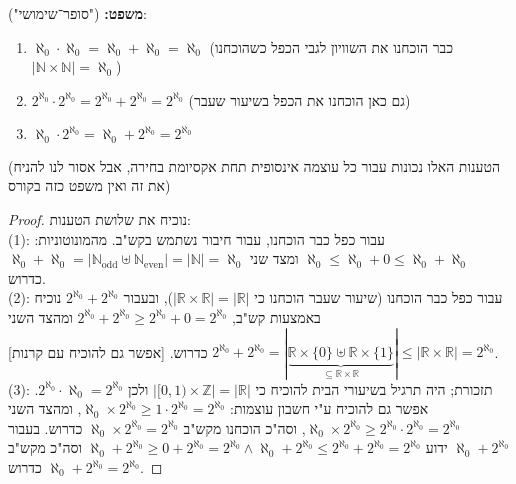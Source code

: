 \documentclass[]{article}
\newcommand\N     {\mathbb{N}}
\newcommand\Z     {\mathbb{Z}}
\newcommand\R     {\mathbb{R}}
\newcommand\Neven {\N_{\mathrm{even}}}
\newcommand\Nodd  {\N_{\mathrm{odd }}}
\newcommand\az    {\aleph_0}
\newcommand\taz   {2^{\aleph_0}}
\begin{document}
	\textbf{משפט: }("סופר־שימושי"): 
	\begin{enumerate}
		\item $ \az \cdot \az = \az + \az  = \az $ (כבר הוכחנו את השוויון לגבי הכפל כשהוכחנו $ |\N\times\N| = \az $)
		\item $ \taz \cdot \taz = \taz + \taz = \taz $ (גם כאן הוכחנו את הכפל בשיעור שעבר)
		\item $ \az \cdot \taz = \az + \taz = \taz $
	\end{enumerate}
	(הטענות האלו נכונות עבור כל עוצמה אינסופית תחת אקסיומת בחירה, אבל אסור לנו להניח את זה ואין משפט כזה בקורס)
	\begin{proof} נוכיח את שלושת הטענות: \\
	(1): עבור כפל כבר הוכחנו, עבור חיבור נשתמש בקש"ב. מהמונוטוניות: $ \az \le \az + 0 \le \az + \az $ ומצד שני $ \az + \az = |\Nodd \uplus \Neven| = |\N| = \az $ כדרוש. \\
	(2): עבור כפל כבר הוכחנו (שיעור שעבר הוכחנו כי $ |\R\times\R| = |\R| $), ובעבור $ \taz + \taz $ נוכיח באמצעות קש"ב, $ \taz + \taz \ge \taz + 0 = \taz $ ומהצד השני $ \taz + \taz = |\underbrace{\R \times \{0\} \uplus \R\times \{1\}}_{\subseteq \R\times\R}| \le |\R\times\R| = \taz$ כדרוש. [אפשר גם להוכיח עם קרנות]. \\
	(3): תזכורת; היה תרגיל בשיעורי הבית להוכיח כי $ |[0, 1) \times \Z| = |\R| $ ולכן $ \taz \cdot \az = \taz $. אפשר גם להוכיח ע"י חשבון עוצמות: $ \az \times \taz \ge 1 \cdot \taz = \taz $, ומהצד השני $ \az \times \taz \ge \taz  \cdot \taz = \taz $, וסה"כ הוכחנו מקש"ב $ \az \times \taz = \taz $ כדרוש. בעבור $ \az + \taz $ ידוע $ \az + \taz \ge 0+ \taz = \taz \land \az + \taz \le \taz + \taz = \taz $ וסה"כ מקש"ב $ \az + \taz = \taz $ כדרוש. 
	\end{proof}
	
\end{document}
